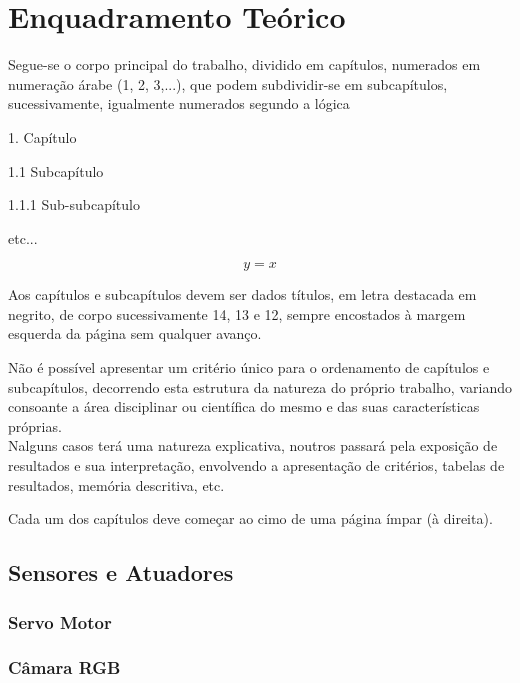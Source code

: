 % 
\chapter{Enquadramento Teórico} %
\label{chap:Chapter1} %


%



Segue-se o corpo principal do trabalho, dividido em capítulos, numerados em numeração árabe (1, 2, 3,...), que podem subdividir-se em subcapítulos, sucessivamente, igualmente numerados segundo a lógica

1. Capítulo 

1.1 Subcapítulo 

1.1.1 Sub-subcapítulo 

etc...

\begin{equation}
y = x
\end{equation} 


Aos capítulos e subcapítulos devem ser dados títulos, em letra destacada em negrito, de corpo sucessivamente 14, 13 e 12, sempre encostados à margem esquerda da página sem qualquer avanço.

Não é possível apresentar um critério único para o ordenamento de capítulos e subcapítulos, decorrendo esta estrutura da natureza do próprio trabalho, variando consoante a área disciplinar ou científica do mesmo e das suas características próprias.\\
Nalguns casos terá uma natureza explicativa, noutros passará pela exposição de resultados e sua interpretação, envolvendo a apresentação de critérios, tabelas de resultados, memória descritiva, etc.

Cada um dos capítulos deve começar ao cimo de uma página ímpar (à direita).

\section{Sensores e Atuadores}

\subsection{Servo Motor}

\subsection{Câmara RGB}

